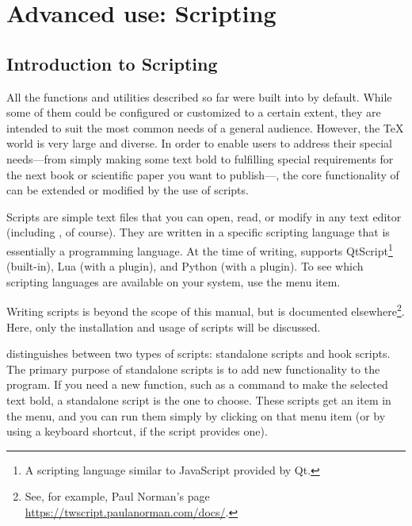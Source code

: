 
\chapter{Advanced use: Scripting}

\section{Introduction to Scripting}

All the functions and utilities described so far were built into {\Tw} by default. While some of them could be configured or customized to a certain extent, they are intended to suit the most common needs of a general audience. However, the {\TeX} world is very large and diverse. In order to enable users to address their special needs---from simply making some text bold to fulfilling special requirements for the next book or scientific paper you want to publish---, the core functionality of {\Tw} can be extended or modified by the use of scripts.

Scripts are simple text files that you can open, read, or modify in any text editor (including {\Tw}, of course). They are written in a specific scripting language that is essentially a programming language. At the time of writing, {\Tw} supports QtScript\footnote{A scripting language similar to JavaScript provided by Qt.} (built-in), Lua (with a plugin), and Python (with a plugin). To see which scripting languages are available on your system, use the \submenu{}\submenu{} menu item.

Writing scripts is beyond the scope of this manual, but is documented elsewhere\footnote{See, for example, Paul Norman's page \url{https://twscript.paulanorman.com/docs/}.}. Here, only the installation and usage of scripts will be discussed.

{\Tw} distinguishes between two types of scripts: standalone scripts and hook scripts. The primary purpose of standalone scripts is to add new functionality to the program. If you need a new function, such as a command to make the selected text bold, a standalone script is the one to choose. These scripts get an item in the  menu, and you can run them simply by clicking on that menu item (or by using a keyboard shortcut, if the script provides one).

